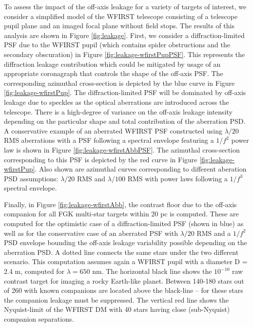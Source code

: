 \documentclass[]{spie}  %
\begin{document}
To assess the impact of the off-axis leakage for a variety of targets of interest, we consider a simplified model of the WFIRST telescope consisting of a telescope pupil plane and an imaged focal plane without field stops. The results of this analysis are shown in Figure \ref{fig:leakage}. First, we consider a diffraction-limited PSF due to the WFIRST pupil (which contains spider obstructions and the secondary obscuration) in Figure \ref{fig:leakage-wfirstPupPSF}. This represents the diffraction leakage contribution which could be mitigated by usage of an appropriate coronagraph that controls the shape of the off-axis PSF. The corresponding azimuthal cross-section is depicted by the blue curve in Figure \ref{fig:leakage-wfirstPup}. The diffraction-limited PSF will be dominated by off-axis leakage due to speckles as the optical aberrations are introduced across the telescope. There is a high-degree of variance on the off-axis leakage intensity depending on the particular shape and total contribution of the aberration PSD. A conservative example of an aberrated WFIRST PSF constructed using $\lambda/20$ RMS aberrations with a PSF following a spectral envelope featuring a $1/f^2$ power law is shown in Figure \ref{fig:leakage-wfirstAbbPSF}. The azimuthal cross-section corresponding to this PSF is depicted by the red curve in Figure \ref{fig:leakage-wfirstPup}. Also shown are azimuthal curves corresponding to different aberation PSD assumptions: $\lambda/20$ RMS and $\lambda/100$ RMS with  power laws following a $1/f^{3}$ spectral envelope. 

Finally, in Figure \ref{fig:leakage-wfirstAbb}, the contrast floor due to the off-axis companion for all FGK multi-star targets within 20 pc is computed. These are computed for the optimistic case of a diffraction-limited PSF (shown in blue) as well as for the conservative case of an aberrated PSF with $\lambda/20$ RMS and a $1/f^2$ PSD envelope bounding the off-axis leakage variability possible depending on the aberration PSD. A dotted line connects the same stars under the two different scenario. This computation assumes again a WFIRST pupil with a diameter D = 2.4 m, computed for $\lambda = 650$ nm. The horizontal black line shows the $10^{-10}$ raw contrast target for imaging a rocky Earth-like planet. Between 140-180 stars out of 260 with known companions are located above the black-line --  for these stars the companion leakage must be suppressed. The vertical red line shows the Nyquist-limit of the WFIRST DM with 40 stars having close (sub-Nyquist) companion separations.
\end{document}
